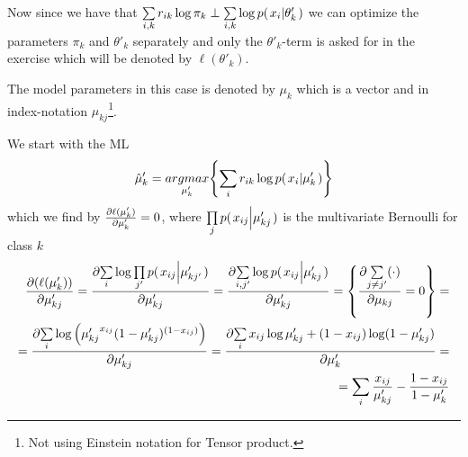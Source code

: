 \documentclass[a4paper,twoside=false,abstract=false,numbers=noenddot,
titlepage=false,headings=small,parskip=half,version=last]{scrartcl}
\begin{document}
\begin{solution}
    Now since we have that $\sum\limits_{i,k}r_{ik}\log\pi_k \perp
    \sum\limits_{i,k}\log p{(\left. x_i \middle\vert \theta'_k \right.)}$ we can optimize the parameters
    $\pi_k$ and $\theta'_k$ separately and only the $\theta'_k$-term is asked for in the
    exercise which will be denoted by $\ell(\theta'_k)$.

    The model parameters in this case is denoted by $\mu_k$ which is a vector
    and in index-notation $\mu_{kj}$\footnote{Not using Einstein notation for
    Tensor product.}.

    We start with the ML
    \begin{equation}
        \hat{\mu}'_k = \underset{\mu'_k}{argmax}{\left\{\sum\limits_i
        r_{ik}\log p{(\left. x_i \middle\vert \mu'_k \right.)}\right\}}
    \end{equation}
    which we find by $\frac{\partial{\ell(\mu'_k)}}{\partial{\mu'_k}}=0$, where 
    $\prod\limits_j p{(\left. x_{ij} \middle\vert \mu'_{kj} \right.)}$ 
    is the multivariate Bernoulli for class $k$
    \begin{eqnarray}
        \frac{\partial{
            \left(
            \ell(\mu'_k)
            \right)
        }}{\partial{
            \mu'_{kj}
        }} = 
        \frac{\partial{
            \sum\limits_i\log \prod\limits_{j'} p{(\left. x_{ij} \middle\vert \mu'_{kj'} \right.)}
        }}{\partial{
            \mu'_{kj} 
        }}=
        \frac{\partial{
        \sum\limits_{i,j'}\log p{(\left. x_{ij} \middle\vert \mu'_{kj} \right.)} 
        }}{\partial{
            \mu'_{kj}
        }}= \left\{
            \frac{\partial{
                \sum\limits_{j\neq j'} (\cdot)
            }}{\partial{
                \mu_{kj}
            }} = 0
            \right\}  = \\
        =
        \frac{\partial{
            \sum\limits_{i}\log \left(
                {\mu'_{kj}}^{x_{ij}}
                (1-{\mu'_{kj}})^{(1-x_{ij})}
            \right)
        }}{\partial{
            \mu'_{kj}
        }}
        =
        \frac{\partial{
            \sum\limits_{i} x_{ij}\log{\mu'_{kj}} + (1-x_{ij})\log({1-\mu'_{kj}})
        }}{\partial{
            \mu'_k  
        }} = \\
        = \sum\limits_{i} \frac{x_{ij}}{\mu'_{kj}} - \frac{1-x_{ij}}{1-\mu'_k}
    \end{eqnarray}

\end{solution}

\end{document}
